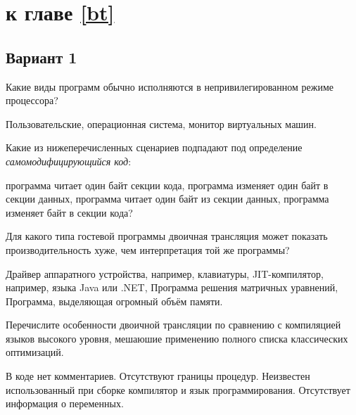 
\section{\Questions к главе \ref{bt}} %

\subsection*{Вариант 1}

\begin{questions}

\question[3] Какие виды программ обычно исполняются в непривилегированном режиме процессора?
\begin{choices}
    \correctchoice Пользовательские,
    \choice операционная система,
    \choice монитор виртуальных машин.
\end{choices}

\question[3] Какие из нижеперечисленных сценариев подпадают под определение \emph{самомодифицирующийся код}:
\begin{choices}
    \choice программа читает один байт  секции кода,
    \choice программа изменяет один байт в секции данных,
    \choice программа читает один байт из секции данных,
    \correctchoice программа изменяет байт в секции кода?
\end{choices}

\question[3] Для какого типа гостевой программы двоичная трансляция может показать производительность хуже, чем интерпретация той же программы?
\begin{choices}
    \choice Драйвер аппаратного устройства, например, клавиатуры,
    \correctchoice JIT-компилятор, например, языка Java или .NET,
    \choice Программа решения матричных уравнений,
    \choice Программа, выделяющая огромный объём памяти.
\end{choices}

\question[3] Перечислите особенности двоичной трансляции по сравнению с компиляцией языков высокого уровня, мешаюшие применению полного списка классических оптимизаций.
\begin{choices}
    \choice В коде нет комментариев.
    \correctchoice Отсутствуют границы процедур.
    \choice Неизвестен использованный при сборке компилятор и язык программирования.
    \correctchoice Отсутствует информация о переменных.
\end{choices}


\end{questions}
